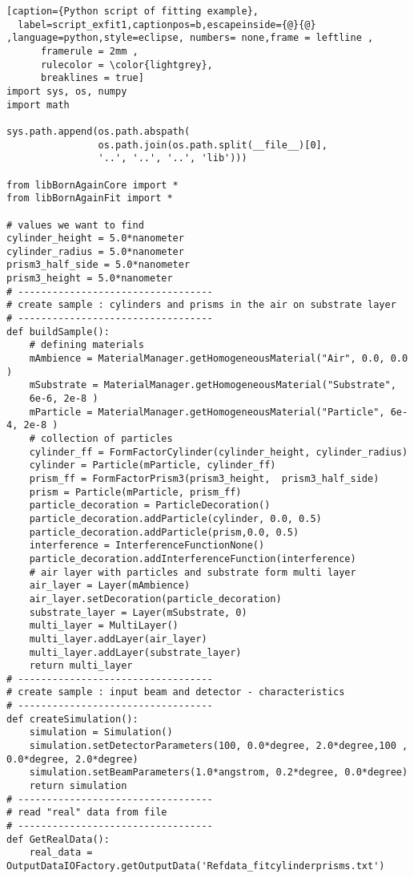 \begin{lstlisting}[caption={Python script of fitting example},
  label=script_exfit1,captionpos=b,escapeinside={@}{@} ,language=python,style=eclipse, numbers= none,frame = leftline ,
      framerule = 2mm ,
      rulecolor = \color{lightgrey},
      breaklines = true]
import sys, os, numpy
import math 

sys.path.append(os.path.abspath(
                os.path.join(os.path.split(__file__)[0],
                '..', '..', '..', 'lib')))

from libBornAgainCore import *
from libBornAgainFit import *

# values we want to find
cylinder_height = 5.0*nanometer
cylinder_radius = 5.0*nanometer
prism3_half_side = 5.0*nanometer
prism3_height = 5.0*nanometer
# ----------------------------------
# create sample : cylinders and prisms in the air on substrate layer
# ----------------------------------
def buildSample(): 
    # defining materials
    mAmbience = MaterialManager.getHomogeneousMaterial("Air", 0.0, 0.0 )
    mSubstrate = MaterialManager.getHomogeneousMaterial("Substrate",
    6e-6, 2e-8 )
    mParticle = MaterialManager.getHomogeneousMaterial("Particle", 6e-4, 2e-8 )
    # collection of particles
    cylinder_ff = FormFactorCylinder(cylinder_height, cylinder_radius)
    cylinder = Particle(mParticle, cylinder_ff)
    prism_ff = FormFactorPrism3(prism3_height,  prism3_half_side)
    prism = Particle(mParticle, prism_ff)
    particle_decoration = ParticleDecoration()
    particle_decoration.addParticle(cylinder, 0.0, 0.5)
    particle_decoration.addParticle(prism,0.0, 0.5)  
    interference = InterferenceFunctionNone()
    particle_decoration.addInterferenceFunction(interference)
    # air layer with particles and substrate form multi layer
    air_layer = Layer(mAmbience)
    air_layer.setDecoration(particle_decoration)
    substrate_layer = Layer(mSubstrate, 0)
    multi_layer = MultiLayer()
    multi_layer.addLayer(air_layer)
    multi_layer.addLayer(substrate_layer)
    return multi_layer
# ----------------------------------
# create sample : input beam and detector - characteristics
# ----------------------------------
def createSimulation():
    simulation = Simulation()
    simulation.setDetectorParameters(100, 0.0*degree, 2.0*degree,100 , 0.0*degree, 2.0*degree)
    simulation.setBeamParameters(1.0*angstrom, 0.2*degree, 0.0*degree)
    return simulation
# ----------------------------------
# read "real" data from file
# ----------------------------------
def GetRealData():
    real_data = OutputDataIOFactory.getOutputData('Refdata_fitcylinderprisms.txt')

\end{lstlisting}
